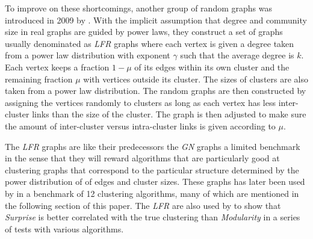 To improve on these shortcomings, another group of random graphs was 
introduced in 2009 by \cite{lancichinetti2008}. With the implicit 
assumption that degree and community size in real graphs are guided by 
power laws, they construct a set of graphs usually denominated as 
\emph{LFR} graphs where each vertex is given a degree taken from a power 
law distribution with exponent $\gamma$ such that the average degree is 
$k$.  Each vertex keeps a fraction $1-\mu$ of its edges within its own 
cluster and the remaining fraction $\mu$ with vertices outside its 
cluster.  The sizes of clusters are also taken from a power law 
distribution. The random graphs are then constructed by assigning the 
vertices randomly to clusters as long as each vertex has less 
inter-cluster links than the size of the cluster. The graph is then 
adjusted to make sure the amount of inter-cluster versus intra-cluster 
links is given according to $\mu$.

The \emph{LFR} graphs are like their predecessors the \emph{GN} graphs a 
limited benchmark in the sense that they will reward algorithms that are 
particularly good at clustering graphs that correspond to the particular 
structure determined by the power distribution of of edges and cluster 
sizes. These graphs has later been used by \cite{lancichinetti2009} in a 
benchmark of 12 clustering algorithms, many of which are mentioned in 
the following section of this paper. The \emph{LFR} are also used by 
\cite{aldecoa2010} to show that \emph{Surprise} is better correlated 
with the true clustering than \emph{Modularity} in a series of tests 
with various algorithms.

